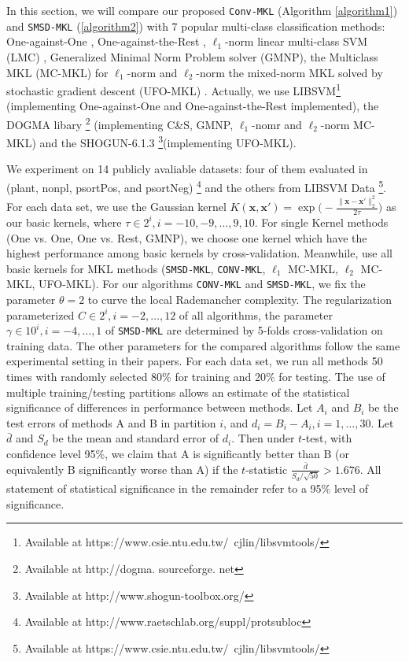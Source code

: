 \documentclass{article}
\begin{document}
In this section, we will  compare our proposed \texttt{Conv-MKL} (Algorithm \ref{algorithm1}) and \texttt{SMSD-MKL} (\ref{algorithm2})
with 7 popular multi-class classification methods:
 One-against-One \cite{knerr1990single}, One-against-the-Rest \cite{bottou1994comparison}, 
$\ell_1$-norm linear multi-class SVM (LMC) \cite{CrammerS02},
Generalized Minimal Norm Problem solver (GMNP)\cite{franc2005optimization},
the Multiclass MKL (MC-MKL) for $\ell_1$-norm and $\ell_2$-norm \cite{ZienO2007}
 the mixed-norm MKL solved by stochastic gradient descent (UFO-MKL) \cite{OrabonaL11}.
Actually, we use LIBSVM\footnote{Available at https://www.csie.ntu.edu.tw/~cjlin/libsvmtools/} 
(implementing One-against-One and One-against-the-Rest implemented),
the DOGMA libary \footnote{Available at http://dogma. sourceforge. net} \cite{orabona2009dogma} (implementing C\&S, GMNP, 
$\ell_1$-nomr and $\ell_2$-norm MC-MKL) and the SHOGUN-6.1.3 \footnote{Available at http://www.shogun-toolbox.org/}(implementing UFO-MKL).

We experiment on 14 publicly avaliable datasets:
four of them evaluated in \cite{ZienO2007} (plant, nonpl, psortPos, and psortNeg)
\footnote{Available at http://www.raetschlab.org/suppl/protsubloc}
and the others from LIBSVM Data \footnote{Available at https://www.csie.ntu.edu.tw/~cjlin/libsvmtools/}.
For each data set, we use the Gaussian kernel
$K(\mathbf{x}, \mathbf{x}')=\exp\Big(-\frac{\|\mathbf{x}-\mathbf{x}'\|_2^2}{2\tau}\Big)$ as our basic kernels,
where $\tau \in {2^i, i=-10,-9,\ldots,9,10}$. For single Kernel methods (One vs. One, One vs. Rest, GMNP),
we choose one kernel which have the highest performance among basic kernels by cross-validation.
Meanwhile, use all basic kernels for MKL methods (\texttt{SMSD-MKL}, \texttt{CONV-MKL}, $\ell_1$ MC-MKL, $\ell_2$ MC-MKL, UFO-MKL).
For our algorithms \texttt{CONV-MKL} and \texttt{SMSD-MKL}, we fix the parameter $\theta=2$ to curve the local Rademancher complexity.
The regularization parameterized $C \in {2^i, i=-2, \ldots, 12}$ of all algorithms,
the parameter $\gamma \in {10^i, i=-4, \ldots, 1}$ of \texttt{SMSD-MKL} are determined by 5-folds cross-validation on training data.
The other parameters for the compared algorithms follow the same experimental setting in their papers.
For each data set, we run all methods 50 times with randomly selected 80\% for training and 20\% for testing.
The use of multiple training/testing partitions allows an estimate of the statistical significance of differences
in performance between methods. Let $A_i$ and $B_i$ be the test errors of methods A and B in partition $i$,
and $d_i=B_i-A_i, i=1,\ldots,30$. Let $\bar{d}$ and $S_d$ be the mean and standard error of $d_i$.
Then under $t$-test, with confidence level 95\%, we claim that A is significantly better than B (or equivalently B significantly worse than A)
if the $t$-statistic $\frac{\bar{d}}{S_d/\sqrt{50}} > 1.676$.
All statement of statistical significance in the remainder refer to a 95\% level of significance.
\end{document}
